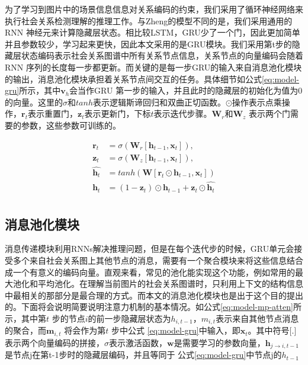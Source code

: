 为了学习到图片中的场景信息信息对关系编码的约束，我们采用了循环神经网络来执行社会关系检测理解的推理工作。与Zheng\cite{zheng2015conditional}的模型不同的是，我们采用通用的RNN 神经元来计算隐藏层状态。相比较LSTM，GRU少了一个门，因此更加简单并且参数较少，学习起来更快，因此本文采用的是GRU模块。我们采用第t步的隐藏层状态编码表示社会关系图谱中所有关系节点信息，关系节点的向量编码会随着RNN 序列的长度每一步都更新。而关键的是每一步GRU的输入来自消息池化模块的输出，消息池化模块承担着关系节点间交互的任务。具体细节如公式\ref{eq:model-gru}所示，其中$\mathbf{v}_h$会当作GRU 第一步的输入，并且此时的隐藏层的初始化为值为0的向量。这里的$\sigma$和$tanh$表示逻辑斯谛回归和双曲正切函数。$\odot$操作表示点乘操作，$\bm{r}_t$表示重置门，$\bm{z}_t$表示更新门，下标$t$表示迭代步骤。$\mathbf{W}_r$和$\mathbf{W}_z$ 表示两个门需要的参数，这些参数可训练的。

\begin{equation} \label{eq:model-gru}
\begin{split}
\bm{r}_t &=  \sigma(\bm{W}_{r}[\bm{h}_{t-1}, \bm{x}_t]), \\
\bm{z}_t &=  \sigma(\bm{W}_{z}[\bm{h}_{t-1}, \bm{x}_t]), \\
\hat{\bm{h}_t} &= tanh(\bm{W}[\bm{r}_t \odot \bm{h}_{t-1}, \bm{x}_{t}])\\
\bm{h}_t &= (1 - \bm{z}_t) \odot \bm{h}_{t - 1} + \bm{z}_t \odot \hat{\bm{h}_t} \\
\end{split}
\end{equation}

\subsection{消息池化模块}

消息传递模块利用RNNs解决推理问题，但是在每个迭代步的时候，GRU单元会接受多个来自社会关系图上其他节点的消息，需要有一个聚合模块来将这些信息结合成一个有意义的编码向量。直观来看，常见的池化能实现这个功能，例如常用的最大池化和平均池化。在理解当前图片的社会关系图谱时，只利用上下文的结构信息中最相关的那部分是最合理的方式。而本文的消息池化模块也是出于这个目的提出的。下面将会说明简要说明注意力机制的基本情况。如公式\ref{eq:model-mp-atten}所示，其中第$t$ 步的节点$i$的前一步隐藏层状态为$h_{i,t-1}$，$m_{i,t}$表示来自其他节点消息的聚合，而$\bm{m}_{i,t}$ 将会作为第$t$ 步中公式
\ref{eq:model-gru}中输入，即$\mathbf{x}_{t}$。其中符号[.]表示两个向量编码的拼接，$\sigma$表示激活函数，$\bm{w}$是需要学习的参数向量，$\bm{h}_{j \to i,t-1}$是节点j在第t-1步时的隐藏层编码，并且等同于
公式\ref{eq:model-gru}中节点j的$h_{t-1}$


